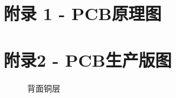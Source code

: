 \documentclass[a4paper]{ctexart}
\begin{document}
\begin{appendices}
	\newpage
		\setlength{\baselineskip}{8pt}
		\section{附录 1 - PCB原理图}
		
		\begin{figure}[H]
			\centering
			\hspace{-10mm}
			\setlength{\leftskip}{-42.5pt}
			
		\end{figure}
	
	\newpage
	
	\section{附录2 - PCB生产版图}
	
	\begin{figure}[H]
		\centering
		\setlength{\leftskip}{-42.5pt}
		\caption{背面铜层}
	\end{figure}
	

\end{appendices}
\end{document}
